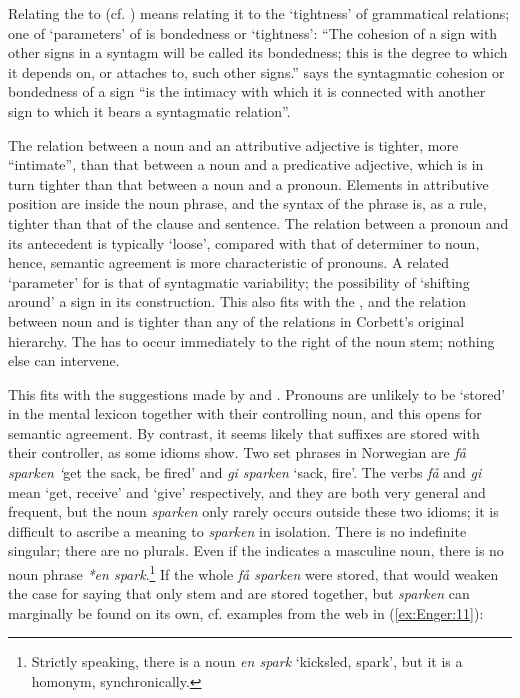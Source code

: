 \documentclass[output=paper]{langsci/langscibook}
\begin{document}
\begin{exe}
\begin{xlist}
\begin{xlist}
\begin{quote}
\end{quote}

Relating the  to  (cf. ) means
relating it to the `tightness' of grammatical relations; one of
%
%
`parameters' of  is bondedness
or `tightness': ``The cohesion of a sign with other signs in a syntagm
will be called its bondedness; this is the degree to which it depends
on, or attaches to, such other signs.'' %
\citet[157]{Lehmann15} %
%
says the
syntagmatic cohesion or bondedness of a sign ``is the intimacy with
which it is connected with another sign to which it bears a syntagmatic
relation''.

The relation between a noun and an attributive adjective is tighter,
more ``intimate'', than that between a noun and a predicative adjective,
which is in turn tighter than that between a noun and a pronoun.
Elements in attributive position are inside the noun phrase, and the
syntax of the phrase is, as a rule, tighter than that of the clause and
sentence. The relation between a pronoun and its antecedent is typically
`loose', compared with that of determiner to noun, hence, semantic
agreement is more characteristic of pronouns. A related `parameter' for
%
\citet[131]{Lehmann15} %
%
is that of syntagmatic variability; the possibility
of `shifting around' a sign in its construction. This also fits with the
, and the relation between noun and  is tighter than any of the
relations in Corbett's original hierarchy. The  has to occur
immediately to the right of the noun stem; nothing else can intervene.

This fits with the suggestions made by %
\citet{Kopcke10} %
%
and %
\citet{Dolberg14}%
%
. Pronouns are unlikely to be `stored' in the mental lexicon
together with their controlling noun, and this opens for semantic
agreement. By contrast, it seems likely that suffixes are stored with
their controller, as some idioms show. Two set phrases in Norwegian are
\emph{få sparken `}get the sack, be fired' and \emph{gi sparken} `sack,
fire'. The verbs \emph{få} and \emph{gi} mean `get, receive' and `give'
respectively, and they are both very general and frequent, but the noun
\emph{sparken} only rarely occurs outside these two idioms; it is
difficult to ascribe a meaning to \emph{sparken} in isolation. There is
no indefinite singular; there are no plurals. Even if the 
indicates a masculine noun, there is no noun phrase \emph{*en
spark}.\footnote{Strictly speaking, there is a noun \emph{en spark}
  `kicksled, spark', but it is a homonym, synchronically.} If the whole
\emph{få sparken} were stored, that would weaken the case for saying
that only stem and  are stored together, but \emph{sparken} can
marginally be found on its own, cf. examples from the web in (\ref{ex:Enger:11}):


\end{xlist}
\end{xlist}
\end{exe}
\end{document}
